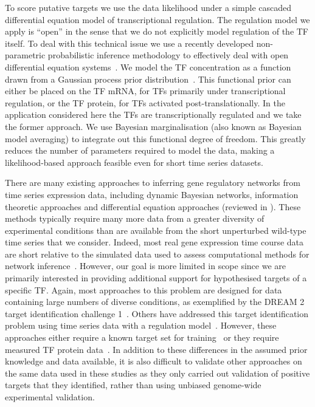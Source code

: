 \documentclass{pnastwo}
\begin{document}
\begin{article}
To score putative targets we use the data likelihood under a simple
cascaded differential equation model of transcriptional regulation. The regulation model
we apply is ``open'' in the sense that we do not explicitly model regulation of the TF
itself. To deal with this technical issue we use a recently developed
non-parametric probabilistic inference methodology to
effectively deal with open differential equation
systems~\cite{Gao2008}. We model the TF concentration as a function
drawn from a Gaussian process prior distribution~\cite{Rasmussen2006}. This functional prior can either be placed
on the TF mRNA, for TFs primarily under transcriptional regulation,
or the TF protein, for TFs activated post-translationally. In the
application considered here the TFs are transcriptionally regulated
and we take the former approach. We use Bayesian marginalisation (also
known as Bayesian model averaging) to
integrate out this functional degree of freedom. This greatly reduces the
number of parameters required to model the data, making a
likelihood-based approach feasible even for short time series
datasets. 

There are many existing approaches to inferring gene regulatory networks from
time series expression data, including dynamic Bayesian networks,
information theoretic approaches and differential equation approaches
(reviewed in \cite{Bansal2007a}). These methods typically require many
more data from a greater diversity of experimental conditions than are
available from the short unperturbed wild-type time series that we
consider. Indeed, most real gene expression time course data are short
relative to the simulated data used to assess computational methods
for network inference~\cite{Ernst2005}. However, our goal is more limited in scope since
we are primarily interested in providing additional support for hypothesised
targets of a specific TF. Again, most approaches to this problem are
designed for data containing large numbers of diverse conditions, as
exemplified by the DREAM 2 target identification
challenge 1~\cite{Stolovitzky2007}. Others
have addressed this target identification problem using time series
data with a regulation model~\cite{Barenco2006a,Gatta2008}. However,
these approaches either require a known target set for training~\cite{Barenco2006a} or
they require measured TF protein data~\cite{Gatta2008}. In addition to
these differences in the assumed prior knowledge and data available,
it is also difficult to validate other approaches on the same data used in these
studies as they only carried out validation of positive targets
that they identified, rather than using unbiased genome-wide
experimental validation. 


\end{article}
\end{document}
